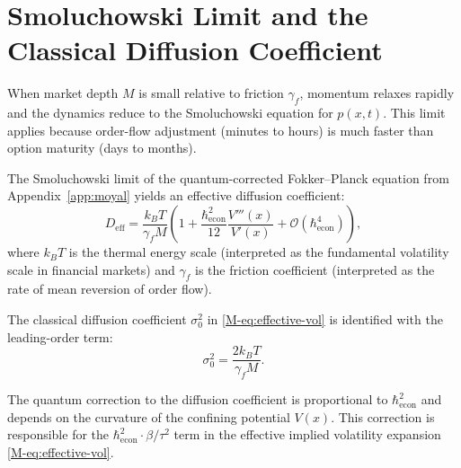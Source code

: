 
\section{Smoluchowski Limit and the Classical Diffusion Coefficient}
\label{app:smoluchowski}

When market depth $M$ is small relative to friction $\gamma_f$, momentum relaxes
rapidly and the dynamics reduce to the Smoluchowski equation for $p(x, t)$. This
limit applies because order-flow adjustment (minutes to hours) is much faster
than option maturity (days to months).

The Smoluchowski limit of the quantum-corrected Fokker--Planck equation from
Appendix~\ref{app:moyal} yields an effective diffusion coefficient:
\begin{equation*}
    D_{\mathrm{eff}} = \frac{k_B T}{\gamma_f M}
    \left( 1 + \frac{\hbar_{\mathrm{econ}}^2}{12} \frac{V'''(x)}{V'(x)}
    + \mathcal{O}(\hbar_{\mathrm{econ}}^4) \right),
\end{equation*}
where $k_B T$ is the thermal energy scale (interpreted as the fundamental
volatility scale in financial markets) and $\gamma_f$ is the friction coefficient
(interpreted as the rate of mean reversion of order flow).

The classical diffusion coefficient $\sigma_0^2$ in \eqref{M-eq:effective-vol} is
identified with the leading-order term:
\begin{equation*}
    \sigma_0^2 = \frac{2 k_B T}{\gamma_f M}.
\end{equation*}

The quantum correction to the diffusion coefficient is proportional to
$\hbar_{\mathrm{econ}}^2$ and depends on the curvature of the confining potential
$V(x)$. This correction is responsible for the
$\hbar_{\mathrm{econ}}^2 \cdot \beta / \tau^2$ term in the effective implied
volatility expansion \eqref{M-eq:effective-vol}.
